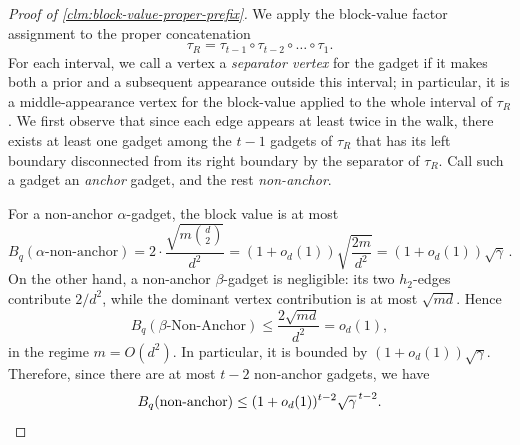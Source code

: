 \documentclass[12pt]{article}
\def \al {\alpha}
\begin{document}
\begin{proof}[Proof of \cref{clm:block-value-proper-prefix}]
We apply the block-value factor assignment to the proper concatenation
\[
    \tau_R=\tau_{t-1}\circ \tau_{t-2}\circ \dots \circ \tau_1.
\]
For each interval, we call a vertex a \emph{separator vertex} for the gadget if it makes both
a prior and a subsequent appearance outside this interval; in
particular, it is a middle-appearance vertex for the block-value applied to the whole interval of $\tau_R$.
%
We first observe that since each edge appears at least twice in the walk, there exists at least one gadget among the \(t-1\)
gadgets of \(\tau_R\) that has its left boundary disconnected from its right boundary by the separator of $\tau_R$. Call such a gadget an \emph{anchor} gadget, and the rest \emph{non-anchor}.
 



%

For a non-anchor \(\alpha\)-gadget, the block value is at most
\[
B_q(\al \text{-non-anchor}) =     2\cdot \frac{\sqrt{m\binom d2}}{d^2}
    =
    (1+o_d(1))\sqrt{\frac{2m}{d^2}}
    =
    (1+o_d(1))\sqrt{\gamma}\,.
\]
On the other hand, a non-anchor \(\beta\)-gadget is negligible: its two
\(h_2\)-edges contribute \(2/d^2\), while the dominant vertex contribution is
at most \(\sqrt{md}\). Hence
\[
    B_q(\beta\text{-Non-Anchor})
    \le
    \frac{2\sqrt{md}}{d^2}
    =
    o_d(1),
\]
in the regime \(m=O(d^2)\). In particular, it is bounded by
\((1+o_d(1))\sqrt{\gamma}\). Therefore, since there are at most \(t-2\)
non-anchor gadgets, we have
\[
    B_q(\text{non\mbox{-}anchor})
    \le
    (1+o_d(1))^{t-2}\sqrt{\gamma}^{\,t-2}.
\]


\end{proof}
\end{document}
